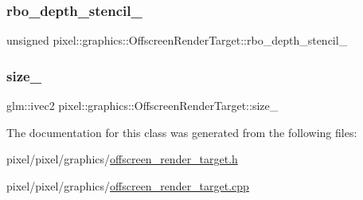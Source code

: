 \subsubsection{\texorpdfstring{rbo\+\_\+depth\+\_\+stencil\+\_\+}{rbo\_depth\_stencil\_}}
{\footnotesize\ttfamily unsigned pixel\+::graphics\+::\+Offscreen\+Render\+Target\+::rbo\+\_\+depth\+\_\+stencil\+\_\+\hspace{0.3cm}{\ttfamily [private]}}

\mbox{\label{classpixel_1_1graphics_1_1_offscreen_render_target_a583e64f23f20f404fd3f845e2d0e207d}} 
\subsubsection{\texorpdfstring{size\+\_\+}{size\_}}
{\footnotesize\ttfamily glm\+::ivec2 pixel\+::graphics\+::\+Offscreen\+Render\+Target\+::size\+\_\+\hspace{0.3cm}{\ttfamily [private]}}



The documentation for this class was generated from the following files\+:\begin{DoxyCompactItemize}
\item 
pixel/pixel/graphics/\hyperlink{offscreen__render__target_8h}{offscreen\+\_\+render\+\_\+target.\+h}\item 
pixel/pixel/graphics/\hyperlink{offscreen__render__target_8cpp}{offscreen\+\_\+render\+\_\+target.\+cpp}\end{DoxyCompactItemize}

